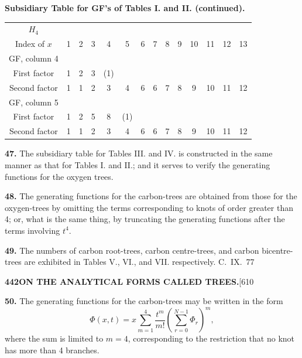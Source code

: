 \documentclass[11pt,a4paper]{book}
\begin{document}
{\noindent\textbf{Subsidiary Table for GF's of Tables I. and II. (continued).}

\begin{center}
\small
\begin{tabular}{|c|c|c|c|c|c|c|c|c|c|c|c|c|c|}
\hline
$H_4$ & & & & & & & & & & & & & \\
Index of $x$ & 1 & 2 & 3 & 4 & 5 & 6 & 7 & 8 & 9 & 10 & 11 & 12 & 13 \\
\hline
GF, column 4 & & & & & & & & & & & & & \\
First factor & 1 & 2 & 3 & (1) & & & & & & & & & \\
Second factor & 1 & 1 & 2 & 3 & 4 & 6 & 6 & 7 & 8 & 9 & 10 & 11 & 12 \\
\hline
GF, column 5 & & & & & & & & & & & & & \\
First factor & 1 & 2 & 5 & 8 & (1) & & & & & & & & \\
Second factor & 1 & 1 & 2 & 3 & 4 & 6 & 6 & 7 & 8 & 9 & 10 & 11 & 12 \\
\hline
\end{tabular}
\end{center}

\medskip
\noindent\textbf{47.}
The subsidiary table for Tables III. and IV. is constructed in the same manner as that for Tables I. and II.; and it serves to verify the generating functions for the oxygen trees.

\medskip
\noindent\textbf{48.}
The generating functions for the carbon-trees are obtained from those for the oxygen-trees by omitting the terms corresponding to knots of order greater than 4; or, what is the same thing, by truncating the generating functions after the terms involving $t^4$.

\medskip
\noindent\textbf{49.}
The numbers of carbon root-trees, carbon centre-trees, and carbon bicentre-trees are exhibited in Tables V., VI., and VII. respectively.
\hfill C.~IX.\ 77

\newpage
\noindent\textbf{442}\hspace{\fill}\textbf{ON THE ANALYTICAL FORMS CALLED TREES.}\hspace{\fill}[610

\noindent\textbf{50.}
The generating functions for the carbon-trees may be written in the form
\[
\Phi(x,t) = x\sum_{m=1}^{4} \frac{t^m}{m!} \left(\sum_{r=0}^{N-1} \Phi_r\right)^m,
\]
where the sum is limited to $m = 4$, corresponding to the restriction that no knot has more than 4 branches.

}
\end{document}
